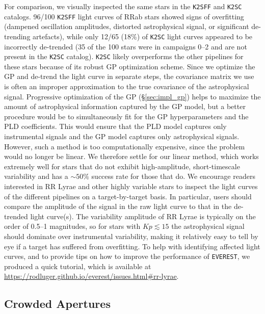 \documentclass[]{emulateapj}
\newcommand{\edited}[1]{{\color{red} #1}}
\begin{document}
For comparison, we visually inspected the same stars in the \texttt{K2SFF} and \texttt{K2SC}
catalogs. 96/100 \texttt{K2SFF} light curves of RRab stars showed signs of overfitting
(dampened oscillation amplitudes, distorted astrophysical signal,
or significant de-trending artefacts), while only 12/65 (18\%) of \texttt{K2SC} light curves
appeared to be incorrectly de-trended (35 of the 100 stars were in campaigns 0--2 and are
not present in the \texttt{K2SC} catalog). \texttt{K2SC} likely overperforms the other
pipelines for these stars because of its robust GP optimization scheme. Since we optimize
the GP and de-trend the light curve in separate steps, the covariance matrix we use is often
an improper approximation to the true covariance of the astrophysical signal. Progressive
optimization of the GP (\S\ref{sec:impl_gp}) helps to maximize the amount of astrophysical
information captured by the GP model, but a better procedure would be to simultaneously
fit for the GP hyperparameters and the PLD coefficients. This would ensure that the PLD
model captures only instrumental signals and the GP model captures only astrophysical
signals. However, such a method is \edited{too computationally expensive}, since the problem would
no longer be linear. We therefore settle for our linear method, which works extremely
well for stars that do not exhibit \edited{high-amplitude, short-timescale} variability and has a ${\sim}50\%$ success
rate for those that do. We encourage readers interested in RR Lyrae and other
\edited{highly variable} stars to inspect the light curves of the different
pipelines on a target-by-target basis. \edited{In particular, users should compare
the amplitude of the signal in the raw light curve to that in the de-trended light curve(s).
The variability amplitude of RR Lyrae is typically on the order of 0.5--1 magnitudes, so for
stars with $Kp \lesssim 15$ the astrophysical signal should dominate over instrumental
variability, making it relatively easy to tell by eye if a target has suffered from
overfitting. To help with identifying affected light curves, and to provide tips on how
to improve the performance of \texttt{EVEREST}, we produced a quick tutorial, which is available at
\url{https://rodluger.github.io/everest/issues.html\#rr-lyrae}.}

\subsection{Crowded Apertures}
\label{sec:crowded}
\end{document}
